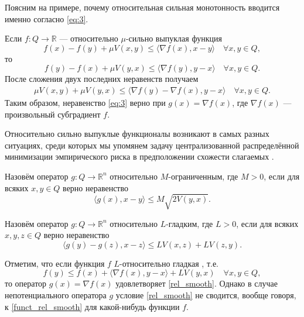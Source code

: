    Поясним на примере, почему относительная сильная монотонность вводится именно согласно  \eqref{eq:3}.
    \begin{example}
        Если $f: Q \longrightarrow \mathbb{R}$ --- относительно $\mu$-сильно выпуклая функция
        \begin{equation}\label{eqrelativestorngconv}
            f(x) - f(y) + \mu V(x, y) \leq \langle \nabla{f(x)}, x - y \rangle \quad   \forall x, y \in Q,
        \end{equation}
        то
        \begin{equation}
            f(y) - f(x) + \mu V(y, x) \leq \langle \nabla{f(y)}, y - x \rangle \quad   \forall x, y \in Q.
        \end{equation}
        После сложения двух последних неравенств получаем
        \begin{align*}
            \mu V(x, y) + \mu V(y, x)\leq \langle \nabla{f(y)} - \nabla{f(x)}, y - x \rangle \quad  \forall x, y \in Q.
        \end{align*}
        Таким образом, неравенство \eqref{eq:3} верно при $g(x) = \nabla{f(x)}$, где $\nabla{f(x)}$ --- произвольный субградиент $f$.
    \end{example}

    Относительно сильно выпуклые функционалы возникают в самых разных ситуациях, среди которых мы упомянем задачу централизованной распределённой минимизации эмпирического риска в предположении схожести слагаемых \cite{Hendr}.

    \begin{definition}\label{DefRelBound}\cite{Main}
        Назовём оператор $g: Q \longrightarrow \mathbb{R}^n$ относительно $M$-ограниченным, где $M >0$, если для всяких $x, y \in Q$ верно неравенство
        \begin{equation}\label{rel_bound}
             \langle g(x), x - y \rangle \leq M\sqrt{2V(y,x)}.
         \end{equation}
    \end{definition}
    \begin{definition}\cite{Inex}
         Назовём оператор $g: Q \longrightarrow \mathbb{R}^n$ относительно $L$-гладким, где $L > 0$, если для всяких $x, y, z \in Q$ верно неравенство
        \begin{equation}\label{rel_smooth}
            \langle g(y)-g(z),x-z\rangle \leq LV(x,z) + LV(z,y).
        \end{equation}
    \end{definition}
    Отметим, что если функция $f$ $L$-относительно гладкая \cite{Bauschke}, т.е.
    \begin{equation}\label{funct_rel_smooth}
        f(y) \leq f(x) + \langle \nabla f(x), y - x\rangle + LV(y, x) \quad \forall x, y \in Q,
    \end{equation}
    то оператор $g(x) = \nabla f(x)$ удовлетворяет \eqref{rel_smooth}. Однако в случае непотенциального оператора $g$ условие \eqref{rel_smooth} не сводится, вообще говоря, к \eqref{funct_rel_smooth} для какой-нибудь функции $f$.

